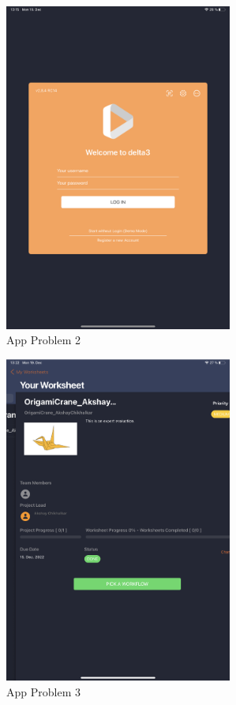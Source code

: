 \documentclass[conference,onecolumn]{IEEEtran}
\begin{document}
    \begin{figure}[H]
        \centerline{\includegraphics[width=75mm,scale=1]{./images/App_Problem_2.png}}
        \caption{App Problem 2}
        \label{App Problem 2}
    \end{figure}
    \begin{figure}[H]
        \centerline{\includegraphics[width=75mm,scale=1]{./images/App_Problem_3.png}}
        \caption{App Problem 3}
        \label{App Problem 3}
    \end{figure}
\end{document}
